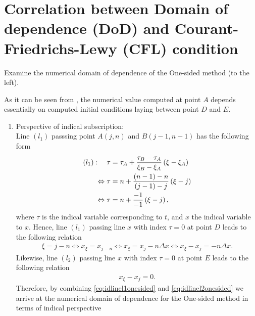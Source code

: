 \documentclass[12pt]{article}
\begin{document}
\pagebreak
\section{Correlation between Domain of dependence (DoD) and Courant-Friedrichs-Lewy (CFL) condition}
\begin{example}
	Examine the numerical domain of dependence of the One-sided method (to the left).
\end{example}
As it can be seen from , 
the numerical value computed at point $A$ depends essentially on 
computed initial conditions laying between point $D$ and $E$.
\begin{enumerate}
	\item Perspective of indical subscription:\\
	      Line $(l_1)$ passsing point $A(j,n)$ and $B(j-1,n-1)$
	      has the following form
	      \begin{align}
		      (l_1):\quad 
		      \tau & = \tau_A + \frac{\tau_B-\tau_A}{\xi_B-\xi_A}\left(\xi-\xi_A\right) \notag \\
		      \Leftrightarrow
		      \tau & = n + \frac{(n-1)-n}{(j-1)-j} \left(\xi-j\right) \notag                   \\
		      \Leftrightarrow
		      \tau & = n + \frac{-1}{-1} \left(\xi-j\right),
	      \end{align}
	      where $\tau$ is the indical variable corresponding to $t$,
	      and $x$ the indical variable to $x$.
	      Hence, line $(l_1)$ passing line $x$ with index $\tau=0$ at point $D$ leads 
	      to the following relation
	      \begin{align}\label{eq:idlinel1onesided}
		      \xi = j - n
		      \Leftrightarrow 
		      x_{\xi} = x_{j-n}
		      \Leftrightarrow 
		      x_{\xi} = x_{j}-n\Delta x
		      \Leftrightarrow 
		      x_{\xi} - x_j =-n\Delta x.
	      \end{align}
	      Likewise, line $(l_2)$ passing line $x$ with index $\tau=0$ at point $E$
	      leads to the following relation
	      \begin{align}\label{eq:idlinel2onesided}
		      x_{\xi} - x_{j} = 0.
	      \end{align}
	      Therefore, by combining \eqref{eq:idlinel1onesided}
	      and \eqref{eq:idlinel2onesided} we arrive at the numerical domain of dependence
	      for the One-sided method in terms of indical perspective

\end{enumerate}
\end{document}
